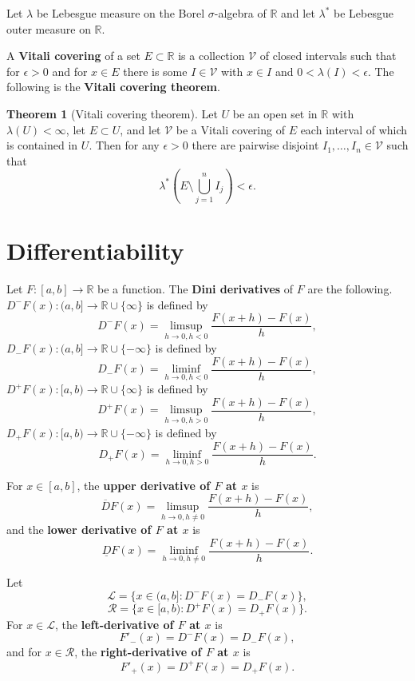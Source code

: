 \documentclass{article}
\theoremstyle{definition}
\newtheorem{theorem}{Theorem}
\theoremstyle{definition}
\begin{document}
Let
$\lambda$ be Lebesgue measure on the Borel $\sigma$-algebra of $\mathbb{R}$ and
let $\lambda^*$ be Lebesgue outer measure on $\mathbb{R}$.

A \textbf{Vitali covering} of a set $E \subset \mathbb{R}$ is a collection $\mathcal{V}$ 
of  closed intervals such that for $\epsilon>0$ and for $x \in E$ there is some $I \in \mathcal{V}$ 
with $x \in I$ and
$0<\lambda(I)<\epsilon$. The following is the \textbf{Vitali covering theorem}.

\begin{theorem}[Vitali covering theorem]
Let $U$ be an open set in $\mathbb{R}$ with $\lambda(U)<\infty$, let
$E \subset U$, and let $\mathcal{V}$ be a Vitali covering of $E$ each interval of which is contained in $U$. Then for any $\epsilon>0$ there
are pairwise disjoint $I_1,\ldots,I_n \in \mathcal{V}$ such that 
\[
\lambda^*\left(E \setminus \bigcup_{j=1}^n I_j \right)< \epsilon.
\]
\end{theorem}









\section{Differentiability}
Let $F:[a,b]  \to \mathbb{R}$ be a function.
The \textbf{Dini derivatives} of $F$ are the following. 
 $D^- F(x):(a,b] \to \mathbb{R} \cup \{\infty\}$ is defined by
\[
D^-F(x) = \limsup_{h \to 0, h<0} \frac{F(x+h)-F(x)}{h},
\]
 $D_-F(x):(a,b] \to \mathbb{R} \cup \{-\infty\}$ is defined by
\[
D_-F(x) = \liminf_{h \to 0, h<0} \frac{F(x+h)-F(x)}{h},
\]
$D^+F(x):[a,b) \to \mathbb{R} \cup \{\infty\}$ is defined by
\[
D^+F(x) = \limsup_{h \to 0, h>0}  \frac{F(x+h)-F(x)}{h},
\]
$D_+F(x):[a,b) \to \mathbb{R} \cup \{-\infty\}$ is defined by
\[
D_+F(x) = \liminf_{h \to 0, h>0}\frac{F(x+h)-F(x)}{h}.
\]


For $x \in [a,b]$, the \textbf{upper derivative of $F$ at $x$} is
\[
\overline{D}F(x) = \limsup_{h \to 0, h \neq 0} \frac{F(x+h)-F(x)}{h},
\]
and  the \textbf{lower derivative of $F$ at $x$} is 
\[
\underline{D}F(x) = \liminf_{h \to 0, h \neq 0} \frac{F(x+h)-F(x)}{h}.
\]


Let
\[
\mathscr{L}=\{x \in (a,b]: D^-F(x)=D_-F(x)\},
\]
\[
\mathscr{R}=\{x \in [a,b): D^+F(x)=D_+F(x)\}.
\]
For $x \in \mathscr{L}$, the \textbf{left-derivative of $F$ at $x$} is
\[
F'_-(x)=D^-F(x)=D_-F(x),
\]
and for $x \in \mathscr{R}$, the  \textbf{right-derivative of $F$ at $x$} is
\[
F'_+(x)=D^+F(x)=D_+F(x).
\]
\end{document}
